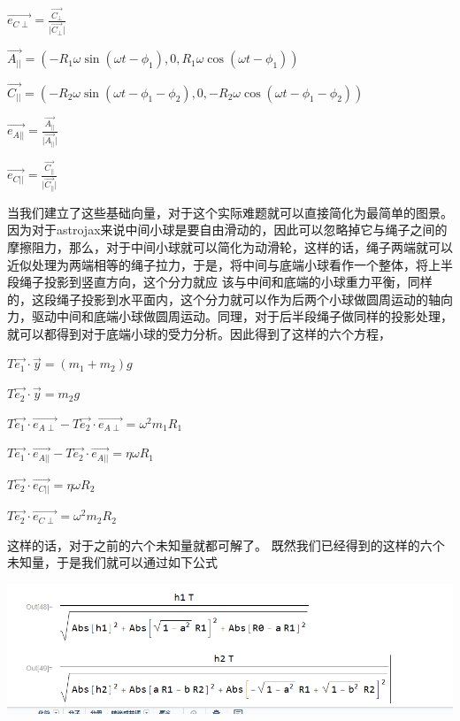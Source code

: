 \documentclass[12pt,a4paper]{ctexart}
\begin{document}
	$\vec{e_{C\perp}}=\frac{\vec{C_{\perp}}}{\vert\vec{C_{\perp}}\vert}$
	
	$\vec{A_{||}}=(-R_1\omega\sin{(\omega t-\phi_1)},0,R_1\omega\cos{(\omega t-\phi_1)})$
	
	$\vec{C_{||}}=(-R_2\omega\sin{(\omega t-\phi_1-\phi_2)},0,-R_2\omega\cos{(\omega t-\phi_1-\phi_2)})$
	
	$\vec{e_{A||}}=\frac{\vec{A_{||}}}{\vert\vec{A_{||}}\vert}$
	
	$\vec{e_{C||}}=\frac{\vec{C_{||}}}{\vert\vec{C_{||}}\vert}$
	
	当我们建立了这些基础向量，对于这个实际难题就可以直接简化为最简单的图景。
	因为对于astrojax来说中间小球是要自由滑动的，因此可以忽略掉它与绳子之间的摩擦阻力，那么，对于中间小球就可以简化为动滑轮，这样的话，绳子两端就可以近似处理为两端相等的绳子拉力，于是，将中间与底端小球看作一个整体，将上半段绳子投影到竖直方向，这个分力就应
	\clearpage
	\thispagestyle{empty}
	该与中间和底端的小球重力平衡，同样的，这段绳子投影到水平面内，这个分力就可以作为后两个小球做圆周运动的轴向力，驱动中间和底端小球做圆周运动。同理，对于后半段绳子做同样的投影处理，就可以都得到对于底端小球的受力分析。因此得到了这样的六个方程，
	
	$T\vec{e_1}·\vec{y}=(m_1+m_2)g$
	
	$T\vec{e_2}·\vec{y}=m_2g$
	
	$T\vec{e_1}·\vec{e_{A\perp}}-T\vec{e_2}·\vec{e_{A\perp}}=\omega^2m_1R_1$
	
	$T\vec{e_1}·\vec{e_{A||}}-T\vec{e_2}·\vec{e_{A||}}=\eta\omega R_1$
	
	$T\vec{e_2}·\vec{e_{C||}}=\eta\omega R_2$
	
	$T\vec{e_2}·\vec{e_{C\perp}}=\omega^2m_2R_2$
	
	这样的话，对于之前的六个未知量就都可解了。
	既然我们已经得到的这样的六个未知量，于是我们就可以通过如下公式
	\textbf{}\
	
	
	
	\includegraphics[scale=0.4]{T09.PNG}\
	
	
	
	\noindent\textbf{}
	\textbf{}\
	
	
	
\end{document}
